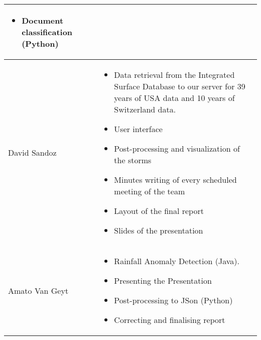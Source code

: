 \begin{longtable}{|l|p{10.5cm}|}
\begin{itemize}
	\item Document classification (Python)
\end{itemize}\\
\hline
David Sandoz &
\begin{itemize}
	\item Data retrieval from the Integrated Surface Database to our server for 39 years of USA data and 10 years of Switzerland data.
	\item User interface
	\item Post-processing and visualization of the storms
	\item Minutes writing of every scheduled meeting of the team
	\item Layout of the final report
	\item Slides of the presentation
\end{itemize}\\
\hline
Amato Van Geyt & \begin{itemize}
	\item Rainfall Anomaly Detection (Java).
	\item Presenting the Presentation
	\item Post-processing to JSon (Python)
	\item Correcting and finalising report
\end{itemize}\\ 
\hline
\end{longtable}
